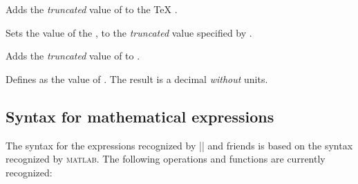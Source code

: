 \begin{command}{\pgfmathaddtocount{}}
  Adds the \emph{truncated} value  of  to the \TeX{} 
  .
\end{command}

\begin{command}{\pgfmathsetcounter{}}
  Sets the value of the , to the \emph{truncated} value 
  specified by . 
\end{command}

\begin{command}{\pgfmathaddtocounter{}}
  Adds the \emph{truncated} value  of  to 
  .
\end{command}


\begin{command}{\pgfmathsetmacro{}}
  Defines  as the  value of . The result
  is a decimal \emph{without} units.
\end{command}



\subsection{Syntax for mathematical expressions}

\label{pgfmath-syntax}

The syntax for the expressions recognized by |\pgfmathparse| and
friends is based on the syntax recognized by \textsc{matlab}. The
following operations and functions are currently recognized:

\begingroup
\let\medskip\smallskip%

